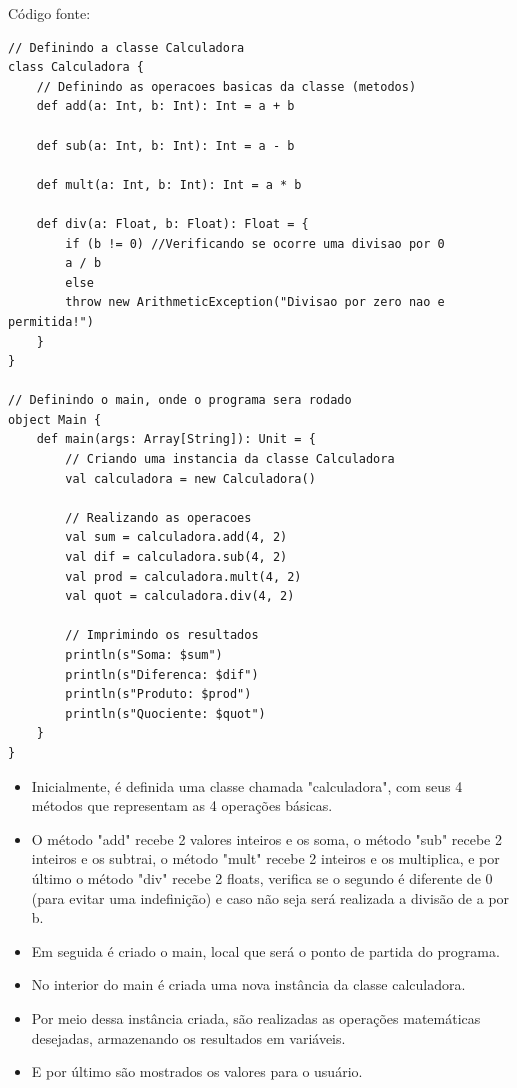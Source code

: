     Código fonte: 
    \begin{lstlisting}[breaklines]
// Definindo a classe Calculadora
class Calculadora {
	// Definindo as operacoes basicas da classe (metodos)
	def add(a: Int, b: Int): Int = a + b
	
	def sub(a: Int, b: Int): Int = a - b
	
	def mult(a: Int, b: Int): Int = a * b
	
	def div(a: Float, b: Float): Float = {
		if (b != 0) //Verificando se ocorre uma divisao por 0
		a / b
		else
		throw new ArithmeticException("Divisao por zero nao e permitida!")
	}
}

// Definindo o main, onde o programa sera rodado
object Main {
	def main(args: Array[String]): Unit = {
		// Criando uma instancia da classe Calculadora
		val calculadora = new Calculadora()
		
		// Realizando as operacoes
		val sum = calculadora.add(4, 2)
		val dif = calculadora.sub(4, 2)
		val prod = calculadora.mult(4, 2)
		val quot = calculadora.div(4, 2)
		
		// Imprimindo os resultados
		println(s"Soma: $sum")
		println(s"Diferenca: $dif")
		println(s"Produto: $prod")
		println(s"Quociente: $quot")
	}
}
    \end{lstlisting}
	\begin{itemize}
		\item Inicialmente, é definida uma classe chamada "calculadora", com seus 4 métodos que representam as 4 operações básicas.
		
		\item O método "add" recebe 2 valores inteiros e os soma, o método "sub" recebe 2 inteiros e os subtrai, o método "mult" recebe 2 inteiros e os multiplica, e por último o método "div" recebe 2 floats, verifica se o segundo é diferente de 0 (para evitar uma indefinição) e caso não seja será realizada a divisão de a por b.
		
		\item Em seguida é criado o main, local que será o ponto de partida do programa.
		
		\item No interior do main é criada uma nova instância da classe calculadora.
		
		\item Por meio dessa instância criada, são realizadas as operações matemáticas desejadas, armazenando os resultados em variáveis.
		
		\item E por último são mostrados os valores para o usuário.
	\end{itemize}

